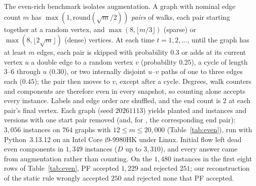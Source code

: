The even-rich benchmark isolates augmentation. A graph with nominal edge count $m$ has $\max(1,\mathrm{round}(\sqrt m/2))$ \emph{pairs} of walks, each pair starting together at a random vertex, and $\max(8,\lfloor m/3\rfloor)$ (sparse) or $\max(8,\lfloor 2\sqrt m\rfloor)$ (dense) vertices. At each time $t=1,2,\dots$, until the graph has at least $m$ edges, each pair is skipped with probability $0.3$ or adds at its current vertex $u$ a double edge to a random vertex $v$ (probability $0.25$), a cycle of length $3$--$6$ through $u$ ($0.30$), or two internally disjoint $u$--$v$ paths of one to three edges each ($0.45$); the pair then moves to $v$, except after a cycle. Degrees, walk counters and components are therefore even in every snapshot, so counting alone accepts every \FREE{} instance. Labels and edge order are shuffled, and the end count is $2$ at each pair's final vertex. Each graph (seed $20261113$) yields planted \FIX{} and \FREE{} instances and versions with one start pair removed (and, for \FIX{}, the corresponding end pair): $3{,}056$ instances on $764$ graphs with $12\le m\le20{,}000$ (Table~\ref{tab:even}), run with Python~3.13.12 on an Intel Core i9-9980HK under Linux. Initial flow left dead even components in $1{,}349$ instances ($D$ up to $3{,}310$), and every \NO{} answer came from augmentation rather than counting. On the $1{,}480$ \FIX{} instances in the first eight rows of Table~\ref{tab:even}, PF accepted $1{,}229$ and rejected $251$; our reconstruction of the static rule wrongly accepted $250$ and rejected none that PF accepted.

